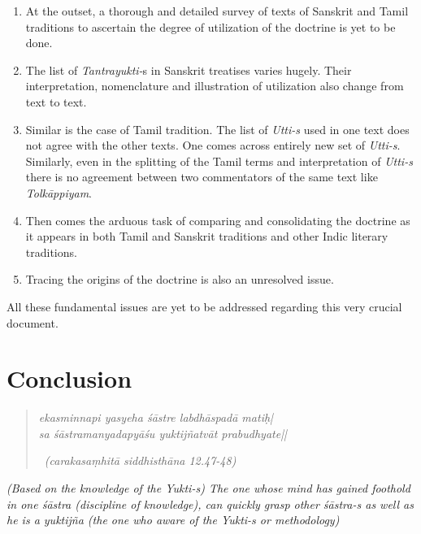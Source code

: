 \begin{enumerate}
\item At the outset, a thorough and detailed survey of texts of Sanskrit and Tamil traditions to ascertain the degree of utilization of the doctrine is yet to be done.

 \item The list of \textit{Tantrayukti-}s in Sanskrit treatises varies hugely. Their interpretation, nomenclature and illustration of utilization also change from text to text.

 \item Similar is the case of Tamil tradition. The list of \textit{Utti-s} used in one text does not agree with the other texts. One comes across entirely new set of \textit{Utti-s}. Similarly, even in the splitting of the Tamil terms and interpretation of \textit{Utti-s} there is no agreement between two commentators of the same text like \textit{Tolkāppiyam}.

 \item Then comes the arduous task of comparing and consolidating the doctrine as it appears in both Tamil and Sanskrit traditions and other Indic literary traditions.

 \item Tracing the origins of the doctrine is also an unresolved issue.

\end{enumerate}

All these fundamental issues are yet to be addressed regarding this very crucial document.


\section*{Conclusion}

\begin{verse}
\textit{ekasminnapi yasyeha śāstre labdhāspadā matiḥ|}\\\textit{sa śāstramanyadapyāśu yuktijñatvāt prabudhyate||}

~\hfill \textit{(carakasaṃhitā siddhisthāna 12.47-48)}
\end{verse}

\begin{myquote}
\textit{(Based on the knowledge of the Yukti-s) The one whose mind has gained foothold in one śāstra (discipline of knowledge), can quickly grasp other śāstra-s as well as he is a yuktijña (the one who aware of the Yukti-s or methodology)}
\end{myquote}

